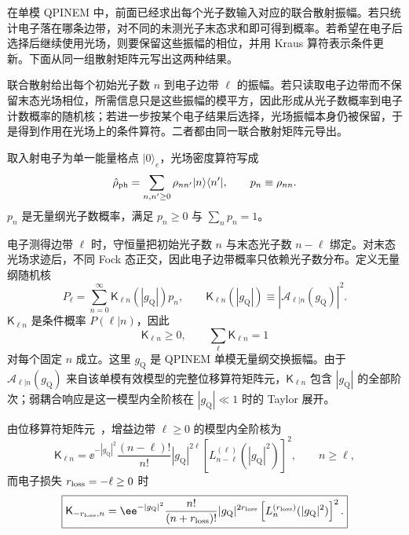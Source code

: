 在单模 QPINEM 中，前面已经求出每个光子数输入对应的联合散射振幅。若只统计电子落在哪条边带，对不同的未测光子末态求和即可得到概率。若希望在电子后选择后继续使用光场，则要保留这些振幅的相位，并用 Kraus 算符表示条件更新。下面从同一组散射矩阵元写出这两种结果。

\begin{exbox}
联合散射给出每个初始光子数 $n$ 到电子边带 $\ell$ 的振幅。若只读取电子边带而不保留末态光场相位，所需信息只是这些振幅的模平方，因此形成从光子数概率到电子计数概率的随机核；若进一步按某个电子结果后选择，光场振幅本身仍被保留，于是得到作用在光场上的条件算符。二者都由同一联合散射矩阵元导出。

取入射电子为单一能量格点 $|0\rangle_e$，光场密度算符写成
\begin{equation*}
\hat\rho_{\rm ph}
=\sum_{n,n'\ge0}\rho_{nn'}|n\rangle\langle n'|,
\qquad
p_n\equiv\rho_{nn}.
\end{equation*}
$p_n$ 是无量纲光子数概率，满足 $p_n\ge0$ 与 $\sum_n p_n=1$。

电子测得边带 $\ell$ 时，守恒量把初始光子数 $n$ 与末态光子数 $n-\ell$ 绑定。对末态光场求迹后，不同 Fock 态正交，因此电子边带概率只依赖光子数分布。定义无量纲随机核
\begin{equation}
\boxed{
P_\ell
=\sum_{n=0}^{\infty}\mathsf K_{\ell n}(|g_{\mathrm Q}|)p_n,
\qquad
\mathsf K_{\ell n}(|g_{\mathrm Q}|)
\equiv|\mathcal A_{\ell|n}(g_{\mathrm Q})|^2.}
\label{eq:electron_spectrum_linear_kernel}
\end{equation}
$\mathsf K_{\ell n}$ 是条件概率 $P(\ell|n)$，因此
\begin{equation*}
\mathsf K_{\ell n}\ge0,
\qquad
\sum_\ell\mathsf K_{\ell n}=1
\end{equation*}
对每个固定 $n$ 成立。这里 $g_{\mathrm Q}$ 是 QPINEM 单模无量纲交换振幅。由于 $\mathcal A_{\ell|n}(g_{\mathrm Q})$ 来自该单模有效模型的完整位移算符矩阵元，$\mathsf K_{\ell n}$ 包含 $|g_{\mathrm Q}|$ 的全部阶次；弱耦合响应是这一模型内全阶核在 $|g_{\mathrm Q}|\ll1$ 时的 Taylor 展开。

由位移算符矩阵元~，增益边带 $\ell\ge0$ 的模型内全阶核为
\begin{equation}
\boxed{
\mathsf K_{\ell n}
=\ee^{-|g_{\mathrm Q}|^2}\frac{(n-\ell)!}{n!}|g_{\mathrm Q}|^{2\ell}
\left[L_{n-\ell}^{(\ell)}(|g_{\mathrm Q}|^2)\right]^2,
\qquad n\ge\ell,}
\label{eq:kernel_gain}
\end{equation}
而电子损失 $r_{\rm loss}=-\ell\ge0$ 时
\begin{equation}
\boxed{
\mathsf K_{-r_{\rm loss},n}
=\ee^{-|g_{\mathrm Q}|^2}\frac{n!}{(n+r_{\rm loss})!}|g_{\mathrm Q}|^{2r_{\rm loss}}
\left[L_n^{(r_{\rm loss})}(|g_{\mathrm Q}|^2)\right]^2.}
\label{eq:kernel_loss}
\end{equation}


\end{exbox}
